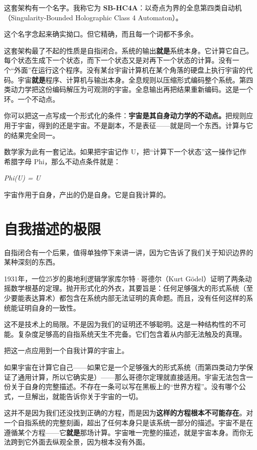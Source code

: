 \documentclass[11pt, twoside, openright]{book}
\begin{document}
这套架构有一个名字。我称它为 \textbf{SB-HC4A}：以奇点为界的全息第四类自动机（Singularity-Bounded Holographic Class 4 Automaton）。

这个名字念起来确实拗口。但它精确，而且每一个词都不多余。

这套架构最了不起的性质是自指闭合。系统的输出\textbf{就是}系统本身。它计算它自己。每个状态生成下一个状态，而下一个状态又是对再下一个状态的计算。没有一个“外面”在运行这个程序。没有某台宇宙计算机在某个角落的硬盘上执行宇宙的代码。宇宙\textbf{就是}程序、计算机与输出本身。全息规则以压缩形式编码整个系统。第四类动力学把这份编码解压为可观测的宇宙。全息输出再把结果重新编码。这是一个环。一个不动点。

你可以把这一点写成一个形式化的条件：\textbf{宇宙是其自身动力学的不动点。}把规则应用于宇宙，得到的还是宇宙。不是副本，不是表征------就是同一个东西。计算与它的结果完全同一。

数学家为此有一套记法。如果把宇宙记作 U，把“计算下一个状态”这一操作记作希腊字母 Phi，那么不动点条件就是：

\textit{Phi(U) = U}

宇宙作用于自身，产出的仍是自身。它是自我计算的。


\section*{自我描述的极限}

自指闭合有一个后果，值得单独停下来讲一讲，因为它告诉了我们关于知识边界的某种深刻的东西。

1931年，一位25岁的奥地利逻辑学家库尔特·哥德尔（Kurt Gödel）证明了两条动摇数学根基的定理。抛开形式化的外衣，其要旨是：任何足够强大的形式系统（至少要能表达算术）都包含在系统内部无法证明的真命题。而且，没有任何这样的系统能证明自身的一致性。

这不是技术上的局限。不是因为我们的证明还不够聪明。这是一种结构性的不可能。复杂度足够高的自指系统天生不完备。它们包含着从内部无法触及的真理。

把这一点应用到一个自我计算的宇宙上。

如果宇宙在计算它自己------如果它是一个足够强大的形式系统（而第四类动力学保证了通用计算，所以它确实是）------那么哥德尔定理就直接适用。宇宙无法包含一份关于自身的完整描述。不存在一条可以写在黑板上的“世界方程”。没有哪个公式，一旦解出，就能告诉你关于宇宙的一切。

这并不是因为我们还没找到正确的方程，而是因为\textbf{这样的方程根本不可能存在}。对一个自指系统的完整刻画，超出了任何本身只是该系统一部分的描述。宇宙不是在遵循某个方程------它\textbf{就是}那场计算。宇宙唯一完整的描述，就是宇宙本身。而你无法跨到它外面去纵观全景，因为根本没有外面。
\end{document}
